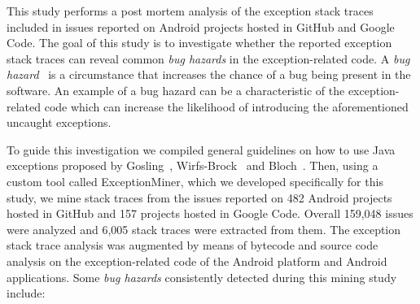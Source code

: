 This study performs a post mortem analysis of the exception stack traces 
included in issues
reported on Android projects hosted in GitHub and Google Code. 
The goal of this study is to investigate whether the reported exception stack traces
 can reveal common \emph{bug hazards} in the exception-related code.  
A \emph{bug hazard}~\cite{binder2000testing}  is a circumstance that increases the 
chance of a bug being present in the software. An example of a bug hazard can 
be a characteristic of  the exception-related code which can increase the likelihood 
of introducing the aforementioned uncaught exceptions.

To guide this investigation we compiled general guidelines on how to use Java
exceptions proposed by Gosling~\cite{gosling2000java},
Wirfs-Brock~\cite{wirfs2006toward} and Bloch~\cite{bloch2008effective}.
Then, using a custom tool called ExceptionMiner,
 which we developed specifically for this study, we mine stack traces from the issues reported 
on 482 Android projects hosted in GitHub and 157 projects hosted in Google Code.
Overall 159,048 issues were analyzed and 6,005 stack traces were extracted from them.
The exception stack trace analysis was augmented by means of bytecode 
and source code analysis on the exception-related code of the Android 
platform and Android applications. Some \emph{bug hazards} consistently detected 
during this mining study include:

